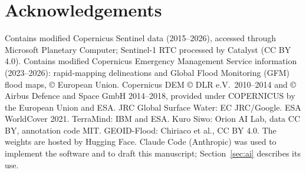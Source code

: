 \documentclass[10pt,twocolumn,a4paper]{article}
\begin{document}
\section*{Acknowledgements}
Contains modified Copernicus Sentinel data (2015--2026), accessed through Microsoft Planetary Computer; Sentinel-1 RTC
processed by Catalyst (CC BY 4.0). Contains modified Copernicus Emergency Management Service information (2023--2026): rapid-mapping delineations and Global Flood Monitoring (GFM)
flood maps, \copyright{} European Union. Copernicus DEM \copyright{} DLR e.V.\ 2010--2014 and \copyright{} Airbus
Defence and Space GmbH 2014--2018, provided under COPERNICUS by the European Union and ESA. JRC Global Surface Water:
EC JRC/Google. ESA WorldCover 2021. TerraMind: IBM and ESA. Kuro Siwo: Orion AI Lab, data CC BY, annotation code
MIT. GEOID-Flood: Chiriaco et al., CC BY 4.0. The weights are hosted by Hugging Face. Claude Code (Anthropic) was used
to implement the software and to draft this manuscript; Section~\ref{sec:ai} describes its use.

{\small


}
\end{document}
